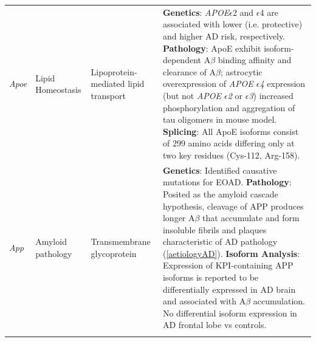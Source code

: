 \begin{landscape}
\begin{longtable}[c]{p{1cm}p{2cm}p{4cm}p{19cm}}
			\centering \textit{Apoe} &
			\centering Lipid Homeostasis  &
			\centering Lipoprotein-mediated lipid transport  &
			\tabitem \textbf{Genetics}: \textit{APOE}$\epsilon$2 and $\epsilon$4 are associated with lower (i.e. protective) and higher AD risk, respectively. \newline
			\tabitem \textbf{Pathology}: ApoE exhibit isoform-dependent A$\beta$ binding affinity and clearance of A$\beta$; astrocytic overexpression of \textit{APOE $\epsilon$4} expression (but not \textit{APOE $\epsilon$2} or \textit{$\epsilon$3}) increased phosphorylation and aggregation of tau oligomers in mouse model\cite{Jablonski2021}. \newline
			\tabitem \textbf{Splicing}: All ApoE isoforms consist of 299 amino acids differing only at two key residues (Cys-112, Arg-158). \\
			\hdashline[0.5pt/5pt]
			
			\centering \textit{App} &
			\centering Amyloid pathology  &
			\centering Transmembrane glycoprotein  &
			\tabitem \textbf{Genetics}: Identified causative mutations for EOAD. \newline
			\tabitem \textbf{Pathology}: Posited as the amyloid cascade hypothesis, cleavage of APP produces longer A$\beta$ that accumulate and form insoluble fibrils and plaques characteristic of AD pathology (\cref{aetiologyAD}).\newline
			\tabitem \textbf{Isoform Analysis}: Expression of KPI-containing APP isoforms is reported to be differentially expressed in AD brain and associated with A$\beta$ accumulation\cite{Zhang2011}. No differential isoform expression in AD frontal lobe vs controls\cite{Panegyres2000}. \\
			\hdashline[0.5pt/5pt]
			

\end{longtable}
\end{landscape}
